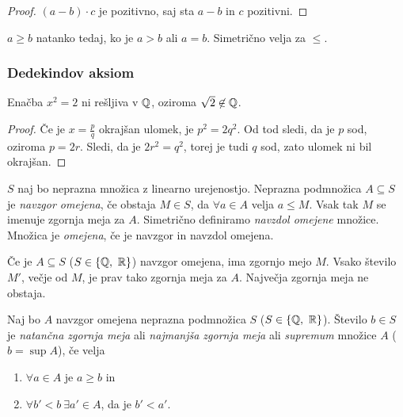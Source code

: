 \documentclass[12pt, a4paper]{article}
\begin{document}
\begin{proof}
$(a-b)\cdot c$ je pozitivno, saj sta $a-b$ in $c$ pozitivni.
\end{proof}

\begin{definicija}
$a\geq b$ natanko tedaj, ko je $a>b$ ali $a=b$. Simetrično velja za $\leq$.
\end{definicija}

\newpage

\subsubsection{Dedekindov aksiom}


\begin{trditev}\label{o3}
Enačba $x^2=2$ ni rešljiva v $\mathbb{Q}$, oziroma $\sqrt{2}\not\in\mathbb{Q}$.
\end{trditev}

\begin{proof}
Če je $x=\frac{p}{q}$ okrajšan ulomek, je $p^2=2q^2$. Od tod sledi, da je $p$ sod, oziroma $p=2r$. Sledi, da je $2r^2=q^2$, torej je tudi $q$ sod, zato ulomek ni bil okrajšan.
\end{proof}

\begin{definicija}
$S$ naj bo neprazna množica z linearno urejenostjo. Neprazna podmnožica $A\subseteq S$ je \emph{navzgor omejena}, če obstaja $M\in S$, da $\forall a\in A$ velja $a\leq M$. Vsak tak $M$ se imenuje zgornja meja za $A$. Simetrično definiramo \emph{navzdol omejene} množice. Množica je \emph{omejena}, če je navzgor in navzdol omejena.
\end{definicija}

\begin{opomba}
Če je $A\subseteq S$ ($S\in\left\{\mathbb{Q},~\mathbb{R}\right\}$) navzgor omejena, ima zgornjo mejo $M$. Vsako število $M'$, večje od $M$, je prav tako zgornja meja za $A$. Največja zgornja meja ne obstaja.
\end{opomba}

\begin{definicija}
Naj bo $A$ navzgor omejena neprazna podmnožica $S$ ($S\in\left\{\mathbb{Q},~\mathbb{R}\right\}$). Število $b\in S$ je \emph{natančna zgornja meja} ali \emph{najmanjša zgornja meja} ali \emph{supremum} množice $A$ ($b=\sup A$), če velja

\begin{enumerate}[label=\roman*)]
\item $\forall a\in A$ je $a\geq b$ in
\item $\forall b'<b~\exists a'\in A$, da je $b'<a'$.
\end{enumerate}
\end{definicija}
\end{document}
